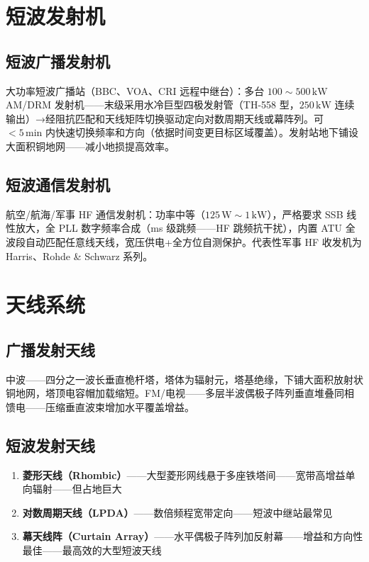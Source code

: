 \documentclass[12pt,UTF8]{ctexbook}
\begin{document}
\section{短波发射机}
\label{sec:shortwave_tx}

\subsection{短波广播发射机}

大功率短波广播站（BBC、VOA、CRI 远程中继台）：多台 $100\sim500\,\mathrm{kW}$ AM/DRM 发射机——末级采用水冷巨型四极发射管（TH-558 型，$250\,\mathrm{kW}$ 连续输出）→经阻抗匹配和天线矩阵切换驱动定向对数周期天线或幕阵列。可 $<5\,\mathrm{min}$ 内快速切换频率和方向（依据时间变更目标区域覆盖）。发射站地下铺设大面积铜地网——减小地损提高效率。

\subsection{短波通信发射机}

航空/航海/军事 HF 通信发射机：功率中等（$125\,\mathrm{W}\sim1\,\mathrm{kW}$），严格要求 SSB 线性放大，全 PLL 数字频率合成（ms 级跳频——HF 跳频抗干扰），内置 ATU 全波段自动匹配任意线天线，宽压供电+全方位自测保护。代表性军事 HF 收发机为 Harris、Rohde \& Schwarz 系列。

\section{天线系统}
\label{sec:tx_antenna_system}

\subsection{广播发射天线}

中波——四分之一波长垂直桅杆塔，塔体为辐射元，塔基绝缘，下铺大面积放射状铜地网，塔顶电容帽加载缩短。FM/电视——多层半波偶极子阵列垂直堆叠同相馈电——压缩垂直波束增加水平覆盖增益。

\subsection{短波发射天线}


\begin{enumerate}
\item \textbf{菱形天线（Rhombic）}——大型菱形网线悬于多座铁塔间——宽带高增益单向辐射——但占地巨大
\item \textbf{对数周期天线（LPDA）}——数倍频程宽带定向——短波中继站最常见
\item \textbf{幕天线阵（Curtain Array）}——水平偶极子阵列加反射幕——增益和方向性最佳——最高效的大型短波天线
\end{enumerate}
\end{document}

